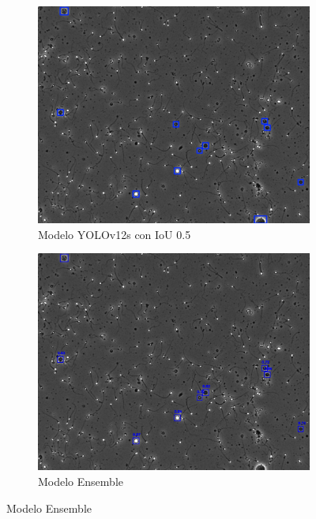 \documentclass[12pt,a4paper,onecolumn,oneside]{report}
\begin{document}
\begin{figure}[H]
  \vspace{0.3cm} 
  
  \begin{subfigure}[b]{0.48\textwidth}
    \centering
    \includegraphics[width=\textwidth]{figuras/evaluacion_cualitativa/9/9_v12.jpg}
    \caption{Modelo YOLOv12s con IoU 0.5}
    \label{fig:yolov12s_IoU0.5_image_9}
  \end{subfigure}
  \hfill
  \begin{subfigure}[b]{0.48\textwidth}
    \centering
    \includegraphics[width=\textwidth]{figuras/evaluacion_cualitativa/9/9_ensemble.jpg}
    \caption{Modelo Ensemble}
    \label{fig:ensemble_image_9}
  \end{subfigure}
  

\end{figure}
\end{document}
